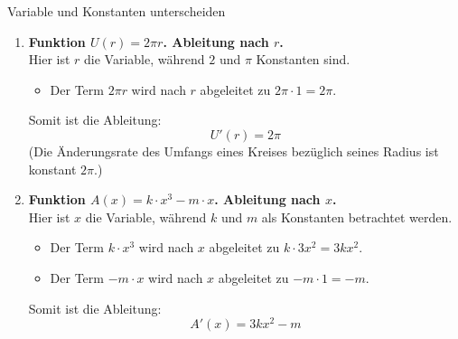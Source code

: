 \begin{loesungsumgebung}{Variable und Konstanten unterscheiden}
\begin{enumerate}[label=(\alph*)]
    \item \textbf{Funktion $U(r) = 2\pi r$. Ableitung nach $r$.} \\
    Hier ist $r$ die Variable, während $2$ und $\pi$ Konstanten sind.
    \begin{itemize}
        \item Der Term $2\pi r$ wird nach $r$ abgeleitet zu $2\pi \cdot 1 = 2\pi$.
    \end{itemize}
    Somit ist die Ableitung:
    $$ U'(r) = 2\pi $$
    (Die Änderungsrate des Umfangs eines Kreises bezüglich seines Radius ist konstant $2\pi$.)

    \item \textbf{Funktion $A(x) = k \cdot x^3 - m \cdot x$. Ableitung nach $x$.} \\
    Hier ist $x$ die Variable, während $k$ und $m$ als Konstanten betrachtet werden.
    \begin{itemize}
        \item Der Term $k \cdot x^3$ wird nach $x$ abgeleitet zu $k \cdot 3x^2 = 3kx^2$.
        \item Der Term $-m \cdot x$ wird nach $x$ abgeleitet zu $-m \cdot 1 = -m$.
    \end{itemize}
    Somit ist die Ableitung:
    $$ A'(x) = 3kx^2 - m $$
\end{enumerate}

\end{loesungsumgebung}

